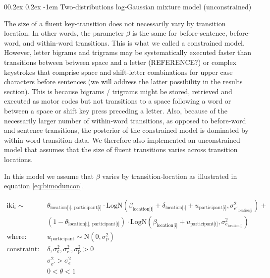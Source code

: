 \documentclass[
  english,
  man,floatsintext]{apa7}
\makeatletter
\let\oldparagraph\paragraph
\renewcommand{\paragraph}[1]{\oldparagraph{#1}\mbox{}}
\renewcommand{\paragraph}{\@startsection{paragraph}{4}{\parindent}%
  {0\baselineskip \@plus 0.2ex \@minus 0.2ex}%
  {-1em}%
  {\normalfont\normalsize\bfseries\itshape\typesectitle}}
\makeatother
\begin{document}
\begin{appendix}
\hypertarget{two-distributions-log-gaussian-mixture-model-unconstrained}{%
\paragraph{Two-distributions log-Gaussian mixture model
(unconstrained)}\label{two-distributions-log-gaussian-mixture-model-unconstrained}}

The size of a fluent key-transition does not necessarily vary by
transition location. In other words, the parameter \(\beta\) is the same
for before-sentence, before-word, and within-word transitions. This is
what we called a constrained model. However, letter bigrams and trigrams
may be systematically executed faster than transitions between between
space and a letter (REFERENCE?) or complex keystrokes that comprise
space and shift-letter combinations for upper case characters before
sentences (we will address the latter possibility in the results
section). This is because bigrams / trigrams might be stored, retrieved
and executed as motor codes but not transitions to a space following a
word or between a space or shift key press preceding a letter. Also,
because of the necessarily larger number of within-word transitions, as
opposed to before-word and sentence transitions, the posterior of the
constrained model is dominated by within-word transition data. We
therefore also implemented an unconstrained model that assumes that the
size of fluent transitions varies across transition locations.

In this model we assume that \(\beta\) varies by transition-location as
illustrated in equation \ref{eq:bimoduncon}.

\begin{equation}
\begin{aligned}
\label{eq:bimoduncon}
\text{iki}_{i} \sim\text{ } & \theta_\text{location[i], participant[i]} \cdot \text{LogN}(\beta_\text{location[i]} + \delta_\text{location[i]} + u_\text{participant[i]}, \sigma_{e'_\text{location[i]}}^2) + \\
  & (1 - \theta_\text{location[i], participant[i]}) \cdot \text{LogN}(\beta_\text{location[i]} + u_\text{participant[i]}, \sigma_{e_\text{location[i]}}^2)\\
    \text{where: }  & u_\text{participant} \sim \text{N}(0, \sigma_\text{p}^2) \\
\text{constraint: } & \delta, \sigma_{e}^2, \sigma_\text{e'}^2, \sigma_\text{p}^2>0\\
        & \sigma_{e'}^2 > \sigma_{e}^2\\
        & 0 < \theta < 1
\end{aligned}
\end{equation}


\end{appendix}
\end{document}
